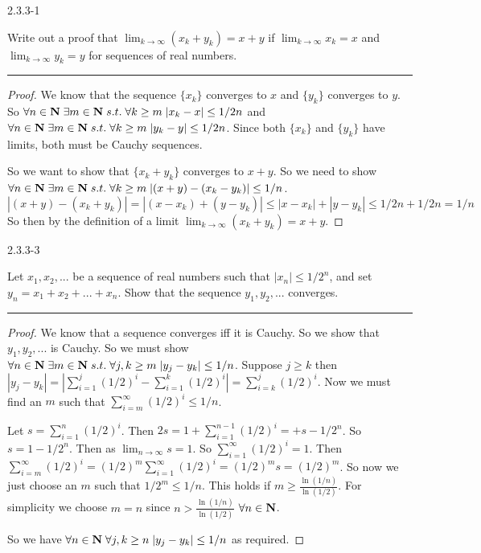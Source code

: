 \documentclass[11pt]{article}
\begin{document}
 2.3.3-1

Write out a proof that $\lim_{k \to \infty} (x_k + y_k) = x + y$ if $\lim_{k \to \infty} x_k = x$ and $\lim_{k \to \infty} y_k = y$ for sequences of real numbers.
\hrule

\begin{proof}

We know that the sequence $\{x_k\}$ converges to $x$ and $\{y_k\}$ converges to $y$. So $\forall n \in \mathbf{N} \; \exists m \in \mathbf{N} \; s.t. \; \forall k \geq m \; |x_k - x| \leq 1/2n$ and $\forall n \in \mathbf{N} \; \exists m \in \mathbf{N} \; s.t. \; \forall k \geq m \; |y_k - y| \leq 1/2n$. Since both $\{x_k\}$ and $\{y_k\}$ have limits, both must be Cauchy sequences. 

So we want to show that $\{x_k + y_k\}$ converges to $x + y$. So we need to show $\forall n \in \mathbf{N} \; \exists m \in \mathbf{N} \; s.t. \; \forall k \geq m \; |(x + y) - (x_k - y_k)| \leq 1/n$.  
$$|(x + y) - (x_k + y_k)| = |(x - x_k) + (y - y_k)| \leq |x - x_k| + |y - y_k| \leq 1/2n + 1/2n = 1/n$$
So then by the definition of a limit $\lim_{k \to \infty} (x_k + y_k) = x + y$. 

\end{proof}


 2.3.3-3

Let $x_1, x_2, ...$ be a sequence of real numbers such that $|x_n| \leq 1/2^n$, and set $y_n = x_1 + x_2 + ... + x_n$. Show that the sequence $y_1, y_2, ...$ converges. 
\hrule

\begin{proof}

We know that a sequence converges iff it is Cauchy. So we show that $y_1, y_2, ...$ is Cauchy. So we must show $\forall n \in \mathbf{N} \; \exists m \in \mathbf{N} \; s.t. \; \forall j,k \geq m \; |y_j - y_k| \leq 1/n$. Suppose $j \geq k$ then $|y_j - y_k| = |\sum_{i = 1} ^j (1/2)^i - \sum_{i = 1} ^k (1/2)^i| = \sum_{i = k} ^j (1/2)^i$. Now we must find an $m$ such that $\sum_{i = m} ^ \infty (1/2)^i \leq 1/n$. 

Let $s = \sum_{i = 1} ^n (1/2)^i$. Then $2s = 1 + \sum_{i = 1} ^{n-1} (1/2)^i =  + s - 1/2^n$. So $s = 1 - 1/2^n$. Then as $\lim_{n \to \infty} s = 1$. So $\sum_{i = 1} ^\infty
 (1/2)^i = 1$. Then $\sum_{i = m} ^ \infty (1/2)^i = (1/2)^m \sum_{i = 1} ^\infty (1/2)^i = (1/2)^m s = (1/2)^m$. So now we just choose an $m$ such that $1/2^m \leq 1/n$. This holds if $m \geq \frac{\ln(1/n)}{\ln(1/2)}$. For simplicity we choose $m = n$ since $n > \frac{\ln(1/n)}{\ln(1/2)}$ $\forall n \in \mathbf{N}$.
 
So we have $\forall n \in \mathbf{N} \; \forall j,k \geq n \; |y_j - y_k| \leq 1/n$ as required.

\end{proof}
\end{document}
